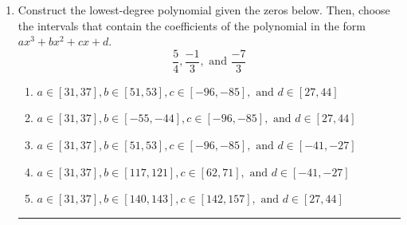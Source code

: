 \documentclass[14pt]{extbook}
\newcommand{\litem}[1]{\item#1\hspace*{-1cm}\rule{\textwidth}{0.4pt}}
\begin{document}
\begin{enumerate}
{\begin{enumerate}[label=\Alph*.]
\end{enumerate} }
\litem{
Construct the lowest-degree polynomial given the zeros below. Then, choose the intervals that contain the coefficients of the polynomial in the form $ax^3+bx^2+cx+d$.\[ \frac{5}{4}, \frac{-1}{3}, \text{ and } \frac{-7}{3} \]\begin{enumerate}[label=\Alph*.]
\item \( a \in [31, 37], b \in [51, 53], c \in [-96, -85], \text{ and } d \in [27, 44] \)
\item \( a \in [31, 37], b \in [-55, -44], c \in [-96, -85], \text{ and } d \in [27, 44] \)
\item \( a \in [31, 37], b \in [51, 53], c \in [-96, -85], \text{ and } d \in [-41, -27] \)
\item \( a \in [31, 37], b \in [117, 121], c \in [62, 71], \text{ and } d \in [-41, -27] \)
\item \( a \in [31, 37], b \in [140, 143], c \in [142, 157], \text{ and } d \in [27, 44] \)

\end{enumerate} }
\end{enumerate}
\end{document}
